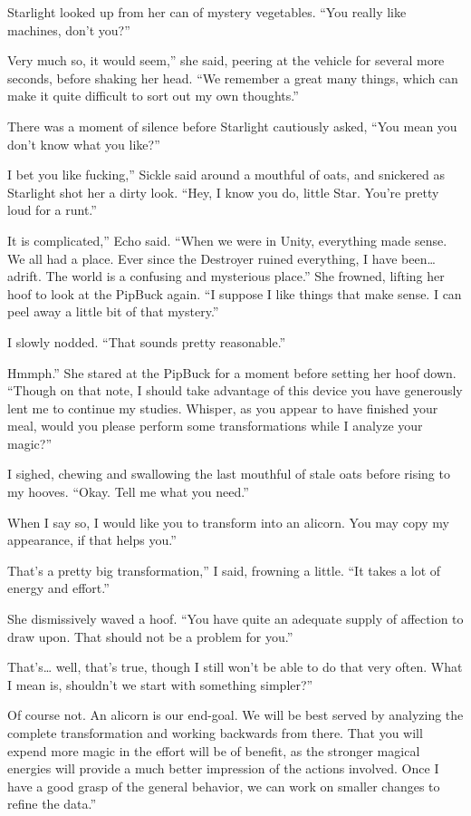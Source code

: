 Starlight looked up from her can of mystery vegetables. “You really like machines, don’t you?”

\leavevmode{}Very much so, it would seem,” she said, peering at the vehicle for several more seconds, before shaking her head. “We remember a great many things, which can make it quite difficult to sort out my own thoughts.”

There was a moment of silence before Starlight cautiously asked, “You mean you don’t know what you like?”

\leavevmode{}I bet you like fucking,” Sickle said around a mouthful of oats, and snickered as Starlight shot her a dirty look. “Hey, I know you do, little Star. You’re pretty loud for a runt.”

\leavevmode{}It is complicated,” Echo said. “When we were in Unity, everything made sense. We all had a place. Ever since the Destroyer ruined everything, I have been… adrift. The world is a confusing and mysterious place.” She frowned, lifting her hoof to look at the PipBuck again. “I suppose I like things that make sense. I can peel away a little bit of that mystery.”

I slowly nodded. “That sounds pretty reasonable.”

\leavevmode{}Hmmph.” She stared at the PipBuck for a moment before setting her hoof down. “Though on that note, I should take advantage of this device you have generously lent me to continue my studies. Whisper, as you appear to have finished your meal, would you please perform some transformations while I analyze your magic?”

I sighed, chewing and swallowing the last mouthful of stale oats before rising to my hooves. “Okay. Tell me what you need.”

\leavevmode{}When I say so, I would like you to transform into an alicorn. You may copy my appearance, if that helps you.”

\leavevmode{}That’s a pretty big transformation,” I said, frowning a little. “It takes a lot of energy and effort.”

She dismissively waved a hoof. “You have quite an adequate supply of affection to draw upon. That should not be a problem for you.”

\leavevmode{}That’s… well, that’s true, though I still won’t be able to do that very often. What I mean is, shouldn’t we start with something simpler?”

\leavevmode{}Of course not. An alicorn is our end-goal. We will be best served by analyzing the complete transformation and working backwards from there. That you will expend more magic in the effort will be of benefit, as the stronger magical energies will provide a much better impression of the actions involved. Once I have a good grasp of the general behavior, we can work on smaller changes to refine the data.”

